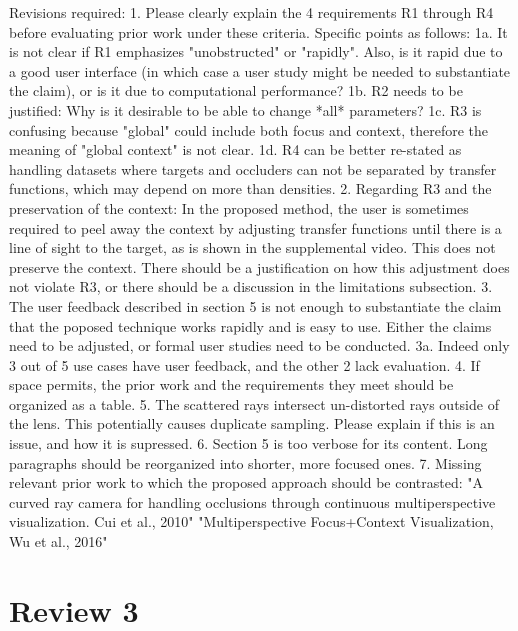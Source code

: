 \documentclass[a4paper,10pt]{article}
\begin{document}
{    Revisions required:
    1. Please clearly explain the 4 requirements R1 through R4 before evaluating prior
    work under these criteria. Specific points as follows:
    1a. It is not clear if R1 emphasizes "unobstructed" or "rapidly". Also, is it
    rapid due to a good user interface (in which case a user study might be needed to
    substantiate the claim), or is it due to computational performance?
    1b. R2 needs to be justified: Why is it desirable to be able to change *all*
    parameters?
    1c. R3 is confusing because "global" could include both focus and context,
    therefore the meaning of "global context" is not clear.
    1d. R4 can be better re-stated as handling datasets where targets and occluders
    can not be separated by transfer functions, which may depend on more than
    densities.
    2. Regarding R3 and the preservation of the context: In the proposed method, the
    user is sometimes required to peel away the context by adjusting transfer
    functions until there is a line of sight to the target, as is shown in the
    supplemental video. This does not preserve the context. There should be a
    justification on how this adjustment does not violate R3, or there should be a
    discussion in the limitations subsection.
    3. The user feedback described in section 5 is not enough to substantiate the
    claim that the poposed technique works rapidly and is easy to use. Either the
    claims need to be adjusted, or formal user studies need to be conducted.
    3a. Indeed only 3 out of 5 use cases have user feedback, and the other 2 lack
    evaluation.
    4. If space permits, the prior work and the requirements they meet should be
    organized as a table.
    5. The scattered rays intersect un-distorted rays outside of the lens. This
    potentially causes duplicate sampling. Please explain if this is an issue, and how
    it is supressed.
    6. Section 5 is too verbose for its content. Long paragraphs should be reorganized
    into shorter, more focused ones.
    7. Missing relevant prior work to which the proposed approach should be
    contrasted:
    "A curved ray camera for handling occlusions through continuous multiperspective
    visualization. Cui et al., 2010"
    "Multiperspective Focus+Context Visualization, Wu et al., 2016"
    
    

\section{Review 3}

}
\end{document}
